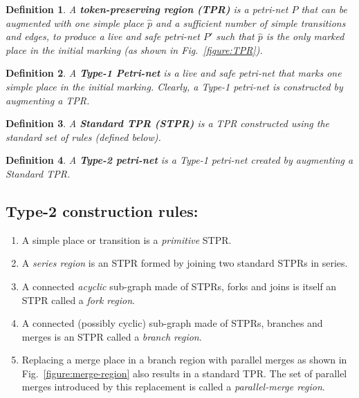\documentclass[conference]{IEEEtran}
\newtheorem{definition}{Definition}[section]
\begin{document}
\begin{definition} A {\bf token-preserving region (TPR)} is a
petri-net $P$ that can be augmented with one simple place $\hat{p}$
and a sufficient number of simple transitions and edges, to produce a
live and safe petri-net $P'$ such that $\hat{p}$ is the only marked
place in the initial marking (as shown in Fig.~\ref{figure:TPR}).
\label{definition:TPR}
\end{definition}

\begin{definition} A {\bf Type-1 Petri-net} is a live and safe
petri-net that marks one simple place in the initial marking. Clearly,
a Type-1 petri-net is constructed by augmenting a TPR.
\end{definition}

\begin{definition}
A {\bf Standard TPR (STPR)} is a TPR constructed using the standard
set of rules (defined below).
\end{definition}

\begin{definition} A {\bf Type-2 petri-net} is a Type-1 petri-net
created by augmenting a Standard TPR.
\end{definition}

\subsection*{Type-2 construction rules:}

\begin{enumerate}
  \item A simple place or transition is a {\em primitive} STPR.

  \item A {\em series region} is an STPR formed by joining two
        standard STPRs in series.

  \item A connected {\it acyclic} sub-graph made of STPRs, forks and
        joins is itself an STPR called a {\em fork region}.

  \item A connected (possibly cyclic) sub-graph made of STPRs, branches
        and merges is an STPR called a {\em branch region}.

  \item Replacing a merge place in a branch region with parallel
        merges as shown in Fig.~\ref{figure:merge-region} also
        results in a standard TPR. The set of parallel merges
        introduced by this replacement is called a {\em parallel-merge
        region}.
\end{enumerate}
\end{document}
